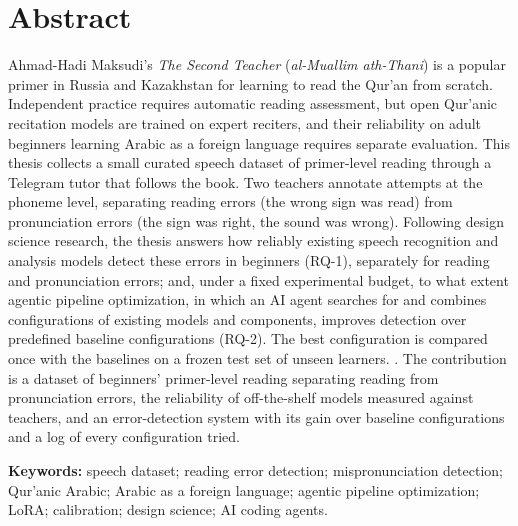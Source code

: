 \chapter*{Abstract}
\thispagestyle{plain}

Ahmad-Hadi Maksudi's \emph{The Second Teacher} (\emph{al-Muallim ath-Thani}) is a popular primer in Russia
and Kazakhstan for learning to read the Qur'an from scratch. Independent practice requires automatic reading
assessment, but open Qur'anic recitation models are trained on expert reciters, and their reliability on adult
beginners learning Arabic as a foreign language requires separate evaluation. This thesis collects a small
curated speech dataset of primer-level reading through a Telegram tutor that follows the book. Two teachers annotate attempts at the phoneme level, separating reading errors (the wrong sign was
read) from pronunciation errors (the sign was right, the sound was wrong). Following design science research,
the thesis answers how reliably existing speech recognition and analysis models detect these errors in
beginners (RQ-1), separately for reading and pronunciation errors; and, under a fixed experimental budget, to what extent
agentic pipeline optimization, in which an AI agent searches for and combines configurations of existing models
and components, improves detection over predefined baseline configurations (RQ-2). The best configuration is
compared once with the baselines on a frozen test set of unseen learners.
. The
contribution is a dataset of beginners' primer-level reading separating reading from pronunciation errors, the
reliability of off-the-shelf models measured against teachers, and an error-detection system with its gain
over baseline configurations and a log of every configuration tried.

\medskip
\noindent\textbf{Keywords:} speech dataset; reading error detection; mispronunciation detection; Qur'anic
Arabic; Arabic as a foreign language; agentic pipeline optimization; LoRA; calibration; design
science; AI coding agents.

